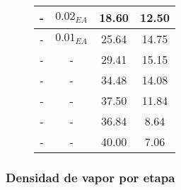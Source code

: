 \begin{figure}[H]
\begin{tabular}{|c|c|c|c|}
        -              & $0.02_{EA}$      & 18.60             & 12.50              \\
        \hline
        -              & $0.01_{EA}$      & 25.64             & 14.75              \\
        \hline
        -              & -                & 29.41             & 15.15              \\
        \hline
        -              & -                & 34.48             & 14.08              \\
        \hline
        -              & -                & 37.50             & 11.84              \\
        \hline
        -              & -                & 36.84             & 8.64               \\
        \hline
        -              & -                & 40.00             & 7.06               \\
        \hline
    \end{tabular}
    \normalsize
\end{figure}

\newpage

\subsubsection{Densidad de vapor por etapa}


